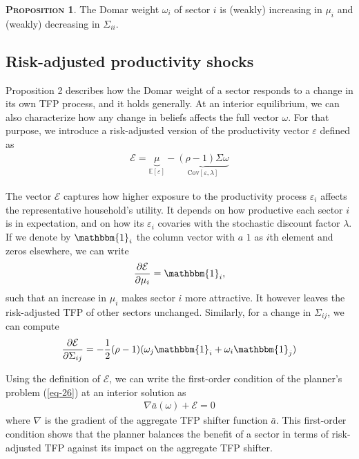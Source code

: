 \documentclass[11pt]{article}
\theoremstyle{definition}
\newtheorem{prop}{\noindent \textbf{\textsc{Proposition}}}
\begin{document}
	\begin{prop}
		The Domar weight $\omega_i$ of sector $i$ is (weakly) increasing in $\mu_i$ and (weakly) decreasing in $\Sigma_{ii}$.
	\end{prop}
	
	\subsection*{Risk-adjusted productivity shocks}
	Proposition 2 describes how the Domar weight of a sector responds to a change in its own TFP process, and it holds generally. At an interior equilibrium, we can also characterize how any change in beliefs affects the full vector $\omega$. For that purpose, we introduce a risk-adjusted version of the productivity vector $\varepsilon$ defined as
	\begin{align}
		\mathcal{E} = \underbrace{\mu}\limits_{\mathbb{E}[\varepsilon]} - \underbrace{(\rho-1)\Sigma\omega}\limits_{\text{Cov}[\varepsilon,\lambda]} \label{eq-27}
	\end{align}
	
	The vector $\mathcal{E}$ captures how higher exposure to the productivity process $\varepsilon_i$ affects the representative household’s utility. It depends on how productive each sector $i$ is in expectation, and on how its $\varepsilon_i$ covaries with the stochastic discount factor $\lambda$. If we denote by $\mathbbm{1}_i$ the column vector with $a$ $1$ as $i$th element and zeros elsewhere, we can write
	\begin{align}
		\frac{\partial \mathcal{E}}{\partial\mu_i} = \mathbbm{1}_i,\label{eq-28}
	\end{align}
	such that an increase in $\mu_i$ makes sector $i$ more attractive. It however leaves the risk-adjusted TFP of other sectors unchanged. Similarly, for a change in $\Sigma_{ij}$, we can compute
	\begin{align}
		\frac{\partial \mathcal{E}}{\partial\Sigma_{ij}} = - \frac{1}{2}(\rho-1) (\omega_j\mathbbm{1}_i + \omega_i\mathbbm{1}_j) \label{eq-29} 
	\end{align}
	
	Using the definition of $\mathcal{E}$, we can write the first-order condition of the planner’s problem (\ref{eq-26}) at an interior solution as
	\begin{align}
		\nabla \bar{a}(\omega) + \mathcal{E} = 0 \label{eq-30}
	\end{align}
	where $\nabla$ is the gradient of the aggregate TFP shifter function $\bar{a}$. This first-order condition shows that the planner balances the benefit of a sector in terms of risk-adjusted TFP against its impact on the aggregate TFP shifter.
	
\end{document}
